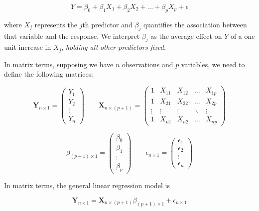 \documentclass[]{book}
\theoremstyle{definition}
\theoremstyle{definition}
\theoremstyle{definition}
\theoremstyle{remark}
\begin{document}
\[ Y = \beta_0 + \beta_1 X_1 + \beta_2 X_2 + \dots + \beta_p X_p + \epsilon \]

where \(X_j\) represents the \(j\)th predictor and \(\beta_j\)
quantifies the association between that variable and the response. We
interpret \(\beta_j\) as the average effect on \(Y\) of a one unit
increase in \(X_j\), \emph{holding all other predictors fixed}.

In matrix terms, supposing we have \(n\) observations and \(p\)
variables, we need to define the following matrices:

\begin{equation}
 \textbf{Y}_{n \times 1} = \begin{pmatrix}
    Y_{1} \\
    Y_{2} \\
    \vdots \\
    Y_{n}
\end{pmatrix}   \,\,\,\,\,\,\,\,\,\,\,\,  \textbf{X}_{n \times (p+1)}  = \begin{pmatrix}
    1      & X_{11} & X_{12} & \dots  & X_{1p} \\
    1      & X_{21} & X_{22} & \dots  & X_{2p} \\
    \vdots & \vdots & \vdots & \ddots & \vdots \\
    1      & X_{n1} & X_{n2} & \dots  & X_{np}
\end{pmatrix}
\end{equation}

\begin{equation}
 {\mathbb{\beta}}_{(p+1) \times 1} = \begin{pmatrix}
    \beta_{0} \\
    \beta_{1} \\
    \vdots \\
    \beta_{p}
    \end{pmatrix}   \,\,\,\,\,\,\,\,\,\,\,\,  {\epsilon}_{n \times 1} = \begin{pmatrix}
        \epsilon_{1} \\
        \epsilon_{2} \\
        \vdots \\
        \epsilon_{n}
    \end{pmatrix}
\end{equation}

In matrix terms, the general linear regression model is

\[ \textbf{Y}_{n \times 1} = \textbf{X}_{n \times (p+1)} {\mathbb{\beta}}_{(p+1) \times 1} + {\epsilon}_{n \times 1} \]
\end{document}
